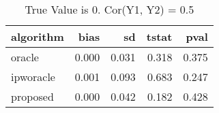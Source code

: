 \begin{table}[h!]

\caption{True Value is 0. Cor(Y1, Y2) = 0.5}
\centering
\begin{tabular}[t]{lrrrr}
\toprule
algorithm & bias & sd & tstat & pval\\
\midrule
oracle & 0.000 & 0.031 & 0.318 & 0.375\\
ipworacle & 0.001 & 0.093 & 0.683 & 0.247\\
proposed & 0.000 & 0.042 & 0.182 & 0.428\\
\bottomrule
\end{tabular}
\end{table}
